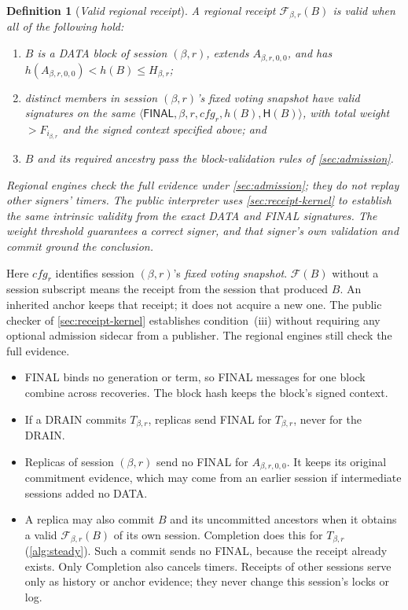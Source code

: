 \documentclass[11pt,a4paper]{article}
\newcommand{\FC}{\mathcal F}
\newcommand{\Hash}{\mathsf H}
\newcommand{\tagg}[1]{\ensuremath{\mathsf{#1}}}
\newcommand{\defterm}[1]{\textcolor{rrBlue}{\textit{#1}}}
\newtheorem{definition}{Definition}[section]
\begin{document}
\begin{definition}[\defterm{Valid regional receipt}]
\label{def:receipt}
A regional receipt $\FC_{\beta,r}(B)$ is valid when all of the following hold:
\begin{enumerate}[label=(\roman*)]
\item $B$ is a DATA block of session $(\beta,r)$, extends
$A_{\beta,r,0,0}$, and has $h(A_{\beta,r,0,0})<h(B)\le H_{\beta,r}$;
\item distinct members in session $(\beta,r)$'s fixed voting snapshot have
valid signatures on the same
$\langle\tagg{FINAL},\beta,r,\mathit{cfg}_r,h(B),\Hash(B)\rangle$,
with total weight $>F_{i_{\beta,r}}$ and the signed context specified above; and
\item $B$ and its required ancestry pass the block-validation rules of
\cref{sec:admission}.
\end{enumerate}
Regional engines check the full evidence under \cref{sec:admission};
they do not replay other signers' timers. The public interpreter uses
\cref{sec:receipt-kernel} to establish the same intrinsic validity from
the exact DATA and FINAL signatures. The weight threshold guarantees a
correct signer, and that signer's own validation and commit ground the
conclusion.
\end{definition}
Here $\mathit{cfg}_r$ identifies session $(\beta,r)$'s \defterm{fixed
voting snapshot}. $\FC(B)$ without a session subscript means the receipt
from the session that produced $B$. An inherited anchor keeps that
receipt; it does not acquire a new one. The public checker of
\cref{sec:receipt-kernel} establishes condition~(iii) without requiring
any optional admission sidecar from a publisher. The regional engines
still check the full evidence.
\begin{itemize}
\item FINAL binds no generation or term, so FINAL messages for one block
combine across recoveries. The block hash keeps the block's signed
context.
\item If a DRAIN commits $T_{\beta,r}$, replicas send FINAL for
$T_{\beta,r}$, never for the DRAIN.
\item Replicas of session $(\beta,r)$ send no FINAL for $A_{\beta,r,0,0}$.
It keeps its original commitment evidence, which may come from an earlier
session if intermediate sessions added no DATA.
\item A replica may also commit $B$ and its uncommitted ancestors when it
obtains a valid $\FC_{\beta,r}(B)$ of its own session. Completion does
this for $T_{\beta,r}$ (\cref{alg:steady}). Such a commit sends no FINAL,
because the receipt already exists. Only Completion also cancels timers.
Receipts of other sessions serve only as history or anchor evidence;
they never change this session's locks or log.
\end{itemize}
\end{document}
